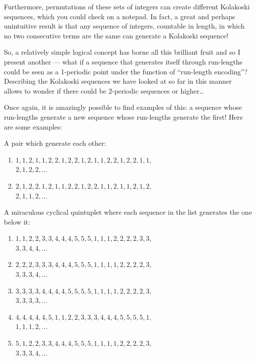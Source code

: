 \documentclass[11pt,a4paper]{report}
\newcounter{count}
\begin{document}
\begin{multicols}{2}
		Furthermore, permutations of these sets of integers can create different Kolakoski sequences, which you could check on a notepad. In fact, a great and perhaps unintuitive result is that any sequence of integers, countable in length, in which no two consecutive terms are the same can generate a Kolakoski sequence! \par
		
		So, a relatively simple logical concept has borne all this brilliant fruit and so I present another --- what if a sequence that generates itself through run-lengths could be seen as a 1-periodic point under the function of “run-length encoding”? Describing the Kolakoski sequences we have looked at so far in this manner allows to wonder if there could be 2-periodic sequences or higher…\par
		
		Once again, it is amazingly possible to find examples of this: a sequence whose run-lengths generate a new sequence whose run-lengths generate the first! Here are some examples:\par
		
		A pair which generate each other:\par
		\begin{enumerate}
			\item \(1, 1, 2, 1, 1, 2, 2, 1, 2, 2, 1, 2, 1, 1, 2, 2, 1, 2, 2, 1, 1,\)\\\( 2, 1, 2, 2, \ldots\)
			\item \(2, 1, 2, 2, 1, 2, 1, 1, 2, 2, 1, 2, 2, 1, 1, 2, 1, 1, 2, 1, 2,\)\\\(2, 1, 1, 2, \ldots\)
		\end{enumerate}
		A miraculous cyclical quintuplet where each sequence in the list generates the one below it:\par
		\begin{enumerate}
			\item \(1, 1, 2, 2, 3, 3, 4, 4, 4, 5, 5, 5, 1, 1, 1, 2, 2, 2, 2, 3, 3,\)\\\(3, 3, 4, 4, \ldots\)
			\item \(2, 2, 2, 3, 3, 3, 4, 4, 4, 5, 5, 5, 1, 1, 1, 1, 2, 2, 2, 2, 3,\)\\\(3, 3, 3, 4, \ldots\)
			\item \(3, 3, 3, 3, 4, 4, 4, 4, 5, 5, 5, 5, 1, 1, 1, 1, 2, 2, 2, 2, 3,\)\\\(3, 3, 3, 3, \ldots\)
			\item \(4, 4, 4, 4, 4, 5, 1, 1, 2, 2, 3, 3, 3, 4, 4, 4, 5, 5, 5, 5, 1,\)\\\(1, 1, 1, 2, \ldots\)
			\item \(5, 1, 2, 2, 3, 3, 4, 4, 4, 5, 5, 5, 1, 1, 1, 1, 2, 2, 2, 2, 3,\)\\\(3, 3, 3, 4, \ldots\)
		\end{enumerate}
		

\end{multicols}
\end{document}
